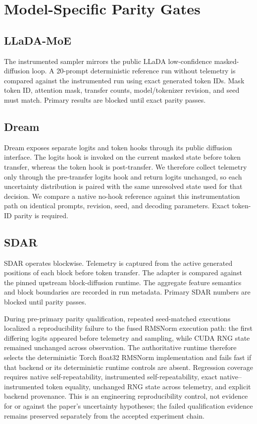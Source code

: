 \section{Model-Specific Parity Gates}

\subsection{LLaDA-MoE}

The instrumented sampler mirrors the public LLaDA low-confidence masked-diffusion loop.
A 20-prompt deterministic reference run without telemetry is compared against the instrumented run using exact generated token IDs.
Mask token ID, attention mask, transfer counts, model/tokenizer revision, and seed must match.
Primary results are blocked until exact parity passes.

\subsection{Dream}

Dream exposes separate logits and token hooks through its public diffusion interface.
The logits hook is invoked on the current masked state before token transfer, whereas the token hook is post-transfer.
We therefore collect telemetry only through the pre-transfer logits hook and return logits unchanged, so each uncertainty distribution is paired with the same unresolved state used for that decision.
We compare a native no-hook reference against this instrumentation path on identical prompts, revision, seed, and decoding parameters.
Exact token-ID parity is required.

\subsection{SDAR}

SDAR operates blockwise.
Telemetry is captured from the active generated positions of each block before token transfer.
The adapter is compared against the pinned upstream block-diffusion runtime.
The aggregate feature semantics and block boundaries are recorded in run metadata.
Primary SDAR numbers are blocked until parity passes.

During pre-primary parity qualification, repeated seed-matched executions
localized a reproducibility failure to the fused RMSNorm execution path: the
first differing logits appeared before telemetry and sampling, while CUDA RNG
state remained unchanged across observation. The authoritative runtime
therefore selects the deterministic Torch float32 RMSNorm implementation and
fails fast if that backend or its deterministic runtime controls are absent.
Regression coverage requires native self-repeatability, instrumented
self-repeatability, exact native--instrumented token equality, unchanged RNG
state across telemetry, and explicit backend provenance. This is an
engineering reproducibility control, not evidence for or against the paper's
uncertainty hypotheses; the failed qualification evidence remains preserved
separately from the accepted experiment chain.

